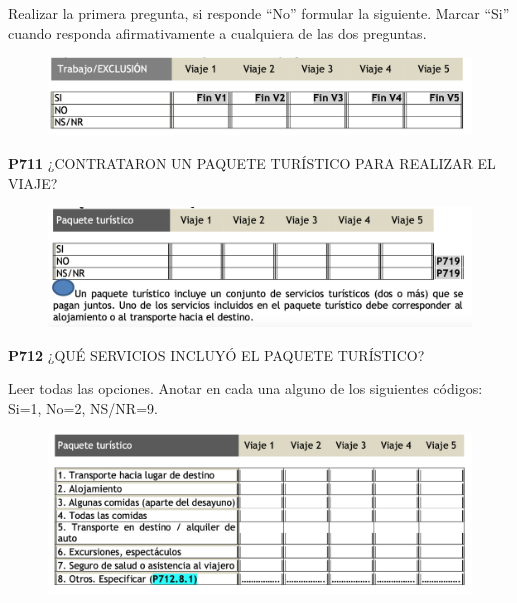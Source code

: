 \documentclass[
  openany]{book}
\begin{document}
Realizar la primera pregunta, si responde ``No'' formular la siguiente. Marcar ``Si'' cuando responda afirmativamente a cualquiera de las dos preguntas.

\begin{figure}

{\centering \includegraphics[width=1\linewidth]{imagenes/figura6-245} 

}

\end{figure}

\textbf{P711} ¿CONTRATARON UN PAQUETE TURÍSTICO PARA REALIZAR EL VIAJE?

\begin{figure}

{\centering \includegraphics[width=1\linewidth]{imagenes/figura6-246} 

}

\end{figure}

\textbf{P712} ¿QUÉ SERVICIOS INCLUYÓ EL PAQUETE TURÍSTICO?

Leer todas las opciones. Anotar en cada una alguno de los siguientes códigos: Si=1, No=2, NS/NR=9.

\begin{figure}

{\centering \includegraphics[width=1\linewidth]{imagenes/figura6-247} 

}

\end{figure}
\end{document}
